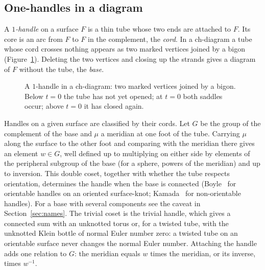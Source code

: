 \documentclass[11pt]{amsart}
\newcommand{\inv}{^{-1}}
\theoremstyle{plain}
\theoremstyle{remark}
\begin{document}
\subsection{One-handles in a diagram}\label{sec:handles}

A \emph{$1$-handle} on a surface $F$ is a thin tube whose two ends are attached to $F$. Its core is an arc
from $F$ to $F$ in the complement, the \emph{cord}. In a ch-diagram a tube whose cord crosses nothing
appears as two marked vertices joined by a bigon (Figure~\ref{fig:handle}). Deleting the two vertices and
closing up the strands gives a diagram of $F$ without the tube, the \emph{base}.

\begin{figure}[ht]
\centering
{}
\caption{A $1$-handle in a ch-diagram: two marked vertices joined by a bigon. Below $t=0$ the tube has
not yet opened; at $t=0$ both saddles occur; above $t=0$ it has closed again.}
\label{fig:handle}
\end{figure}

Handles on a given surface are classified by their cords. Let $G$ be the group of the complement of the
base and $\mu$ a meridian at one foot of the tube. Carrying $\mu$ along the surface to the other foot and
comparing with the meridian there gives an element $w\in G$, well defined up to multiplying on either side by elements of the peripheral
subgroup of the base (for a sphere, powers of the meridian) and up to inversion. This double coset, together with whether the tube respects orientation,
determines the handle when the base is connected (Boyle~\cite{B} for orientable handles on an oriented
surface-knot; Kamada~\cite{K14} for non-orientable handles). For a base with several components see the
caveat in Section~\ref{sec:names}. The trivial coset is the trivial handle, which gives a connected sum
with an unknotted torus or, for a twisted tube, with the unknotted Klein bottle of normal Euler number
zero: a twisted tube on an orientable surface never changes the normal Euler number. Attaching the handle adds one relation to $G$:
the meridian equals $w$ times the meridian, or its inverse, times $w\inv$.
\end{document}

